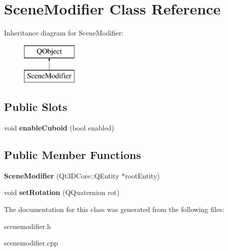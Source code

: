 \hypertarget{class_scene_modifier}{}\section{Scene\+Modifier Class Reference}
\label{class_scene_modifier}
Inheritance diagram for Scene\+Modifier\+:\begin{figure}[H]
\begin{center}
\leavevmode
\includegraphics[height=2.000000cm]{class_scene_modifier}
\end{center}
\end{figure}
\subsection*{Public Slots}
\begin{DoxyCompactItemize}
\item 
\mbox{\label{class_scene_modifier_af59d4644dc92de025ff40caea12be78c}} 
void {\bfseries enable\+Cuboid} (bool enabled)
\end{DoxyCompactItemize}
\subsection*{Public Member Functions}
\begin{DoxyCompactItemize}
\item 
\mbox{\label{class_scene_modifier_acc07d34e62c8ff22c535f2b7f6478505}} 
{\bfseries Scene\+Modifier} (Qt3\+D\+Core\+::\+Q\+Entity $\ast$root\+Entity)
\item 
\mbox{\label{class_scene_modifier_a47af05af2da28da2d54d73be4818a3d0}} 
void {\bfseries set\+Rotation} (Q\+Quaternion rot)
\end{DoxyCompactItemize}


The documentation for this class was generated from the following files\+:\begin{DoxyCompactItemize}
\item 
scenemodifier.\+h\item 
scenemodifier.\+cpp\end{DoxyCompactItemize}
